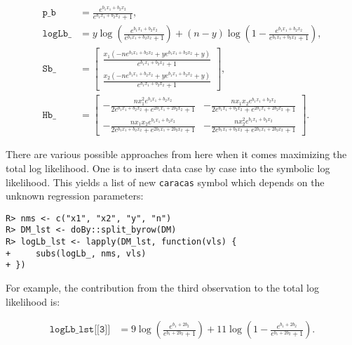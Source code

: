 \begin{align}
\texttt{p\_b}   &= \frac{e^{b_{1} x_{1} + b_{2} x_{2}}}{e^{b_{1} x_{1} + b_{2} x_{2}} + 1}, \\
\texttt{logLb}\_ &= y \log{\left(\frac{e^{b_{1} x_{1} + b_{2} x_{2}}}{e^{b_{1} x_{1} + b_{2} x_{2}} + 1} \right)} + \left(n - y\right) \log{\left(1 - \frac{e^{b_{1} x_{1} + b_{2} x_{2}}}{e^{b_{1} x_{1} + b_{2} x_{2}} + 1} \right)}, \\
\texttt{Sb}\_    &= \left[\begin{matrix}\frac{x_{1} \left(- n e^{b_{1} x_{1} + b_{2} x_{2}} + y e^{b_{1} x_{1} + b_{2} x_{2}} + y\right)}{e^{b_{1} x_{1} + b_{2} x_{2}} + 1}\\\frac{x_{2} \left(- n e^{b_{1} x_{1} + b_{2} x_{2}} + y e^{b_{1} x_{1} + b_{2} x_{2}} + y\right)}{e^{b_{1} x_{1} + b_{2} x_{2}} + 1}\end{matrix}\right], \\
\texttt{Hb}\_    &= \left[\begin{matrix}- \frac{n x_{1}^{2} e^{b_{1} x_{1} + b_{2} x_{2}}}{2 e^{b_{1} x_{1} + b_{2} x_{2}} + e^{2 b_{1} x_{1} + 2 b_{2} x_{2}} + 1} & - \frac{n x_{1} x_{2} e^{b_{1} x_{1} + b_{2} x_{2}}}{2 e^{b_{1} x_{1} + b_{2} x_{2}} + e^{2 b_{1} x_{1} + 2 b_{2} x_{2}} + 1}\\- \frac{n x_{1} x_{2} e^{b_{1} x_{1} + b_{2} x_{2}}}{2 e^{b_{1} x_{1} + b_{2} x_{2}} + e^{2 b_{1} x_{1} + 2 b_{2} x_{2}} + 1} & - \frac{n x_{2}^{2} e^{b_{1} x_{1} + b_{2} x_{2}}}{2 e^{b_{1} x_{1} + b_{2} x_{2}} + e^{2 b_{1} x_{1} + 2 b_{2} x_{2}} + 1}\end{matrix}\right] . 
\end{align}

There are various possible approaches from here when it comes
maximizing the total log likelihood. One is to insert data case by
case into the symbolic log likelihood. This yields a list of new \texttt{caracas}
symbol which depends on the unknown regression parameters:

\begin{verbatim}
R> nms <- c("x1", "x2", "y", "n")
R> DM_lst <- doBy::split_byrow(DM)
R> logLb_lst <- lapply(DM_lst, function(vls) {
+     subs(logLb_, nms, vls)
+ })
\end{verbatim}

For example, the contribution from the third observation to the total log likelihood is:

\begin{align}
\texttt{logLb\_lst[[3]]}  &= 9 \log{\left(\frac{e^{b_{1} + 2 b_{2}}}{e^{b_{1} + 2 b_{2}} + 1} \right)} + 11 \log{\left(1 - \frac{e^{b_{1} + 2 b_{2}}}{e^{b_{1} + 2 b_{2}} + 1} \right)}.
\end{align}


